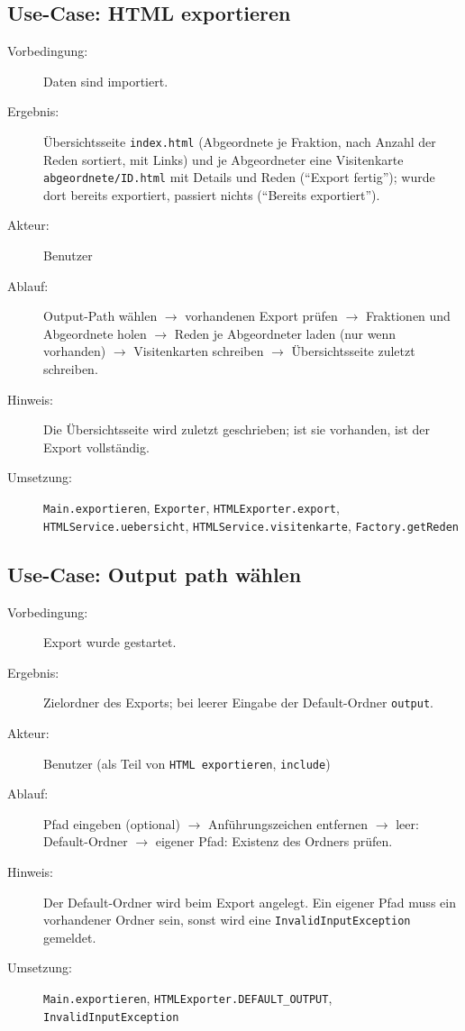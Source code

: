 \subsection{Use-Case: HTML exportieren}
\begin{description}
    \item[Vorbedingung:] Daten sind importiert.
    \item[Ergebnis:] Übersichtsseite \texttt{index.html} (Abgeordnete je Fraktion, nach Anzahl der Reden sortiert, mit Links) und je Abgeordneter eine Visitenkarte \texttt{abgeordnete/ID.html} mit Details und Reden (\enquote{Export fertig}); wurde dort bereits exportiert, passiert nichts (\enquote{Bereits exportiert}).
    \item[Akteur:] Benutzer
    \item[Ablauf:] Output-Path wählen $\rightarrow$ vorhandenen Export prüfen $\rightarrow$ Fraktionen und Abgeordnete holen $\rightarrow$ Reden je Abgeordneter laden (nur wenn vorhanden) $\rightarrow$ Visitenkarten schreiben $\rightarrow$ Übersichtsseite zuletzt schreiben.
    \item[Hinweis:] Die Übersichtsseite wird zuletzt geschrieben; ist sie vorhanden, ist der Export vollständig.
    \item[Umsetzung:] \texttt{Main.exportieren}, \texttt{Exporter}, \texttt{HTMLExporter.export}, \texttt{HTMLService.uebersicht}, \texttt{HTMLService.visitenkarte}, \texttt{Factory.getReden}
\end{description}

\subsection{Use-Case: Output path wählen}
\begin{description}
    \item[Vorbedingung:] Export wurde gestartet.
    \item[Ergebnis:] Zielordner des Exports; bei leerer Eingabe der Default-Ordner \texttt{output}.
    \item[Akteur:] Benutzer (als Teil von \texttt{HTML exportieren}, \texttt{include})
    \item[Ablauf:] Pfad eingeben (optional) $\rightarrow$ Anführungszeichen entfernen $\rightarrow$ leer: Default-Ordner $\rightarrow$ eigener Pfad: Existenz des Ordners prüfen.
    \item[Hinweis:] Der Default-Ordner wird beim Export angelegt. Ein eigener Pfad muss ein vorhandener Ordner sein, sonst wird eine \texttt{InvalidInputException} gemeldet.
    \item[Umsetzung:] \texttt{Main.exportieren}, \texttt{HTMLExporter.DEFAULT\_OUTPUT}, \texttt{InvalidInputException}
\end{description}